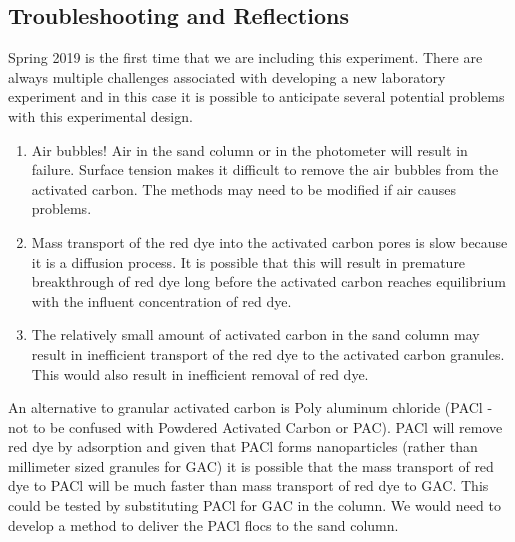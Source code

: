 \documentclass[letterpaper,10pt,english]{sphinxmanual}
\begin{document}
\subsection{Troubleshooting and Reflections}
\label{\detokenize{Adsorption/Adsorption:troubleshooting-and-reflections}}
Spring 2019 is the first time that we are including this experiment. There are always multiple challenges associated with developing a new laboratory experiment and in this case it is possible to anticipate several potential problems with this experimental design.
\begin{enumerate}
\item {} 
Air bubbles! Air in the sand column or in the photometer will result in failure. Surface tension makes it difficult to remove the air bubbles from the activated carbon. The methods may need to be modified if air causes problems.

\item {} 
Mass transport of the red dye into the activated carbon pores is slow because it is a diffusion process. It is possible that this will result in premature breakthrough of red dye long before the activated carbon reaches equilibrium with the influent concentration of red dye.

\item {} 
The relatively small amount of activated carbon in the sand column may result in inefficient transport of the red dye to the activated carbon granules. This would also result in inefficient removal of red dye.

\end{enumerate}

An alternative to granular activated carbon is Poly aluminum chloride (PACl - not to be confused with Powdered Activated Carbon or PAC). PACl will remove red dye by adsorption and given that PACl forms nanoparticles (rather than millimeter sized granules for GAC) it is possible that the mass transport of red dye to PACl will be much faster than mass transport of red dye to GAC. This could be tested by substituting PACl for GAC in the column. We would need to develop a method to deliver the PACl flocs to the sand column.
\end{document}
